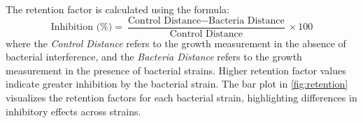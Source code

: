 \vspace{0.5cm} %

\noindent
The retention factor is calculated using the formula:
\[
\text{Inhibition (\%)} = \frac{\text{Control Distance} - \text{Bacteria Distance}}{\text{Control Distance}} \times 100
\]
where the \textit{Control Distance} refers to the growth measurement in the absence of bacterial interference, and the \textit{Bacteria Distance} refers to the growth measurement in the presence of bacterial strains. Higher retention factor values indicate greater inhibition by the bacterial strain. The bar plot in \autoref{fig:retention} visualizes the retention factors for each bacterial strain, highlighting differences in inhibitory effects across strains.